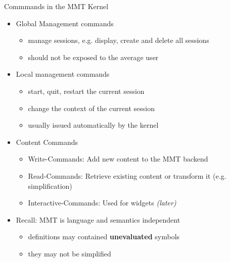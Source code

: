 \documentclass{beamer}
\begin{document}
    \begin{frame}{Commmands in the MMT Kernel}
        \begin{itemize}
            \item Global Management commands
            \begin{itemize}
                \item manage sessions, e.g. display, create and delete all sessions
                \item should not be exposed to the average user
            \end{itemize}
            \item Local management commands
            \begin{itemize}
                \item start, quit, restart the current session
                \item change the context of the current session
                \item usually issued automatically by the kernel
            \end{itemize}
           \item Content Commands
            \begin{itemize}
                \item Write-Commands: Add new content to the MMT backend
                \item Read-Commands: Retrieve existing content or transform it (e.g. simplification)
                \item Interactive-Commands: Used for widgets \textit{(later)}
            \end{itemize}
            \item Recall: MMT is language and semantics independent
            \begin{itemize}
                \item definitions may contained \textbf{unevaluated} symbols
                \item they may not be simplified
            \end{itemize}
        \end{itemize}
    \end{frame}
\end{document}
